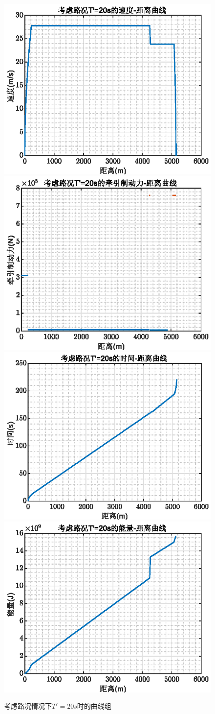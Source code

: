 \documentclass[12pt,a4paper]{nmmcm}
\begin{document}
\begin{figure}[H]
\centering
\includegraphics[width=.49\textwidth,height=0.3\textwidth]{figures/20aa.eps}
\includegraphics[width=.49\textwidth,height=0.3\textwidth]{figures/20bb.eps}
\includegraphics[width=.49\textwidth,height=0.3\textwidth]{figures/20cc.eps}
\includegraphics[width=.49\textwidth,height=0.3\textwidth]{figures/20dd.eps}
\caption{\song\wuhao 考虑路况情况下$T'=20s$时的曲线组}
\end{figure}
\end{document}
